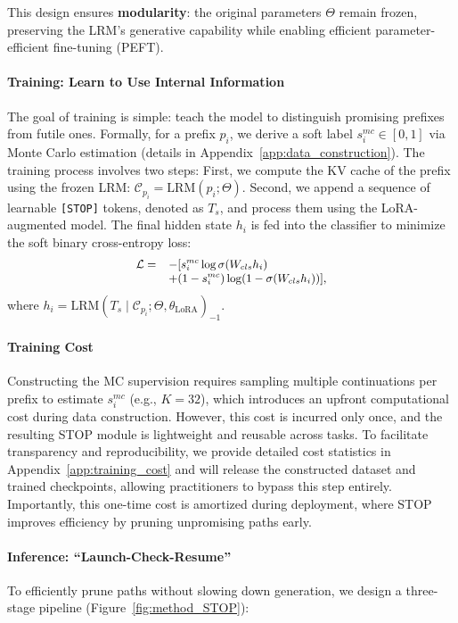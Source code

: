 \documentclass[11pt]{article}
\theoremstyle{plain}
\begin{document}
This design ensures \textbf{modularity}: the original parameters $\Theta$ remain frozen, preserving the LRM's generative capability while enabling efficient parameter-efficient fine-tuning (PEFT).

\paragraph{Training: Learn to Use Internal Information}
The goal of training is simple: teach the model to distinguish promising prefixes from futile ones.
Formally, for a prefix $p_i$, we derive a soft label $s^{mc}_i \in [0,1]$ via Monte Carlo estimation (details in Appendix~\ref{app:data_construction}).
The training process involves two steps:
First, we compute the KV cache of the prefix using the frozen LRM: $\mathcal{C}_{p_i} = \text{LRM}(p_i; \Theta)$.
Second, we append a sequence of learnable \texttt{[STOP]} tokens, denoted as $T_s$, and process them using the LoRA-augmented model.
The final hidden state $h_i$ is fed into the classifier to minimize the soft binary cross-entropy loss:
\begin{equation}\small
\begin{array}{ll}
    \mathcal{L} = & - [ s_i^{mc} \log \sigma (W_{cls}h_i) \\
    & +  (1-s_i^{mc}) \log (1-\sigma (W_{cls}h_i)) ],
\end{array}
\end{equation}
where $h_i = \text{LRM}(T_s \mid \mathcal{C}_{p_i}; \Theta, \theta_{\text{LoRA}})_{-1}$.

\paragraph{Training Cost}
Constructing the MC supervision requires sampling multiple continuations per prefix to estimate $s^{mc}_i$ (e.g., $K=32$), which introduces an upfront computational cost during data construction. However, this cost is incurred only once, and the resulting STOP module is lightweight and reusable across tasks. To facilitate transparency and reproducibility, we provide detailed cost statistics in Appendix~\ref{app:training_cost} and will release the constructed dataset and trained checkpoints, allowing practitioners to bypass this step entirely. Importantly, this one-time cost is amortized during deployment, where STOP improves efficiency by pruning unpromising paths early.

\paragraph{Inference: ``Launch-Check-Resume''}
To efficiently prune paths without slowing down generation, we design a three-stage pipeline (Figure~\ref{fig:method_STOP}):
\end{document}
